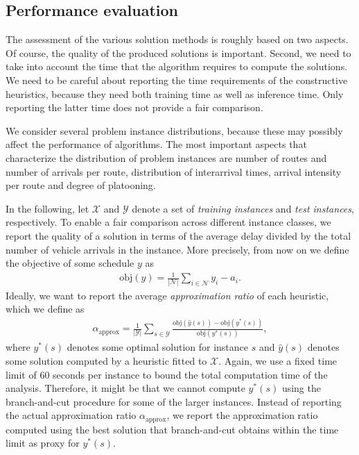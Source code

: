 \documentclass[a4paper]{article}
\theoremstyle{definition}
\theoremstyle{plain}
\begin{document}
\subsection{Performance evaluation}

The assessment of the various solution methods is roughly based on two
aspects. Of course, the quality of the produced solutions is important. Second,
we need to take into account the time that the algorithm requires to compute the
solutions. We need to be careful about reporting the time requirements of the
constructive heuristics, because they need both training time as well as
inference time. Only reporting the latter time does not provide a fair
comparison.

We consider several problem instance distributions, because these may possibly
affect the performance of algorithms. The most important aspects that
characterize the distribution of problem instances are number of routes and
number of arrivals per route, distribution of interarrival times, arrival
intensity per route and degree of platooning.

In the following, let $\mathcal{X}$ and $\mathcal{Y}$ denote a set of \textit{training instances}
and \textit{test instances}, respectively.
%
To enable a fair comparison across different instance classes, we report the
quality of a solution in terms of the average delay divided by the total number
of vehicle arrivals in the instance. More precisely, from now on we define the
objective of some schedule $y$ as
\begin{align*}
  \textrm{obj}(y) = \frac{1}{|\mathcal{N}|} \sum_{i \in \mathcal{N}} y_{i} - a_{i} .
\end{align*}
%
Ideally, we want to report the average \textit{approximation ratio} of each
heuristic, which we define as
\begin{align*}
  \alpha_{\text{approx}} = \frac{1}{|\mathcal{Y}|} \sum_{s \in \mathcal{Y}} \frac{\textrm{obj}(\hat{y}(s)) - \textrm{obj}(y^{*}(s))}{\textrm{obj}(y^{*}(s))} ,
\end{align*}
where $y^{*}(s)$ denotes some optimal solution for instance $s$ and $\hat{y}(s)$
denotes some solution computed by a heuristic fitted to $\mathcal{X}$.
%
Again, we use a fixed time limit of 60 seconds per instance to bound the total
computation time of the analysis. Therefore, it might be that we cannot compute $y^{*}(s)$ using
the branch-and-cut procedure for some of the larger instances.
%
Instead of reporting the actual approximation ratio $\alpha_{\text{approx}}$, we
report the approximation ratio computed using the best solution that
branch-and-cut obtains within the time limit as proxy for $y^{*}(s)$.
\end{document}
